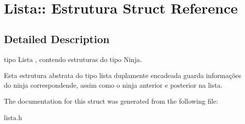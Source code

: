 \hypertarget{structLista_1_1_01Estrutura}{}\section{Lista\+:\+: Estrutura Struct Reference}
\label{structLista_1_1_01Estrutura}


\subsection{Detailed Description}
tipo Lista , contendo estruturas do tipo Ninja.

Esta estrutura abstrata do tipo lista duplamente encadeada guarda informações do ninja correspondende, assim como o ninja anterior e posterior na lista. 

The documentation for this struct was generated from the following file\+:\begin{DoxyCompactItemize}
\item 
lista.\+h\end{DoxyCompactItemize}
